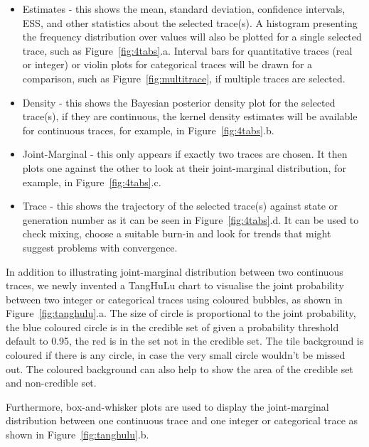 \documentclass{bioinfo}
\begin{document}
\begin{itemize}
\item Estimates - this shows the mean, standard deviation, confidence intervals, ESS, and other statistics about the selected trace(s). A histogram presenting the frequency distribution over values will also be plotted for a single selected trace, such as Figure~\ref{fig:4tabs}.a. Interval bars for quantitative traces (real or integer) or violin plots for categorical traces will be drawn for a comparison, such as Figure~\ref{fig:multitrace}, if multiple traces are selected.

\item Density - this shows the Bayesian posterior density plot for the selected trace(s), if they are continuous, the kernel density estimates will be available for continuous traces, for example, in Figure~\ref{fig:4tabs}.b.

\item Joint-Marginal - this only appears if exactly two traces are chosen. It then plots one against the other to look at their joint-marginal distribution, for example, in Figure~\ref{fig:4tabs}.c.

\item Trace - this shows the trajectory of the selected trace(s) against state or generation number as it can be seen in Figure~\ref{fig:4tabs}.d. It can be used to check mixing, choose a suitable burn-in and look for trends that might suggest problems with convergence.

\end{itemize}

In addition to illustrating joint-marginal distribution between two continuous traces, we newly invented a TangHuLu chart to visualise the joint probability between two integer or categorical traces using coloured bubbles, as shown in Figure~\ref{fig:tanghulu}.a. The size of circle is proportional to the joint probability, the blue coloured circle is in the credible set of given a probability threshold default to 0.95, the red is in the set not in the credible set. The tile background is coloured if there is any circle, in case the very small circle wouldn't be missed out. The coloured background can also help to show the area of the credible set and non-credible set.

Furthermore, box-and-whisker plots are used to display the joint-marginal distribution between one continuous trace and one integer or categorical trace as shown in Figure~\ref{fig:tanghulu}.b.
\end{document}
